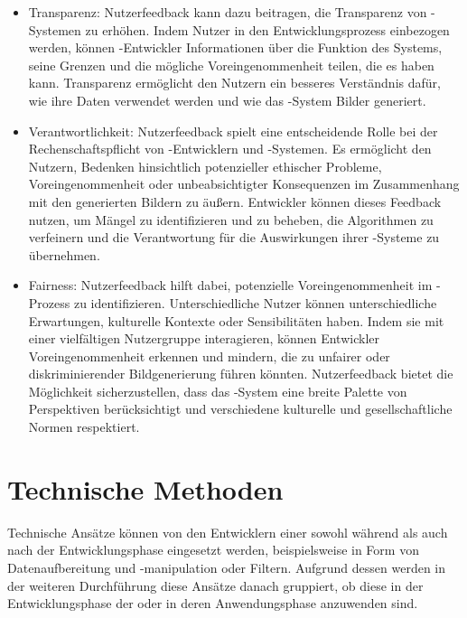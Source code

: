 \documentclass[hidelinks,12pt]{report}
\begin{document}
\begin{itemize}
	\item Transparenz: Nutzerfeedback kann dazu beitragen, die Transparenz von -Systemen zu erhöhen. Indem Nutzer in den Entwicklungsprozess einbezogen werden, können -Entwickler Informationen über die Funktion des Systems, seine Grenzen und die mögliche Voreingenommenheit teilen, die es haben kann. Transparenz ermöglicht den Nutzern ein besseres Verständnis dafür, wie ihre Daten verwendet werden und wie das -System Bilder generiert.
	\item Verantwortlichkeit: Nutzerfeedback spielt eine entscheidende Rolle bei der Rechenschaftspflicht von -Entwicklern und -Systemen. Es ermöglicht den Nutzern, Bedenken hinsichtlich potenzieller ethischer Probleme, Voreingenommenheit oder unbeabsichtigter Konsequenzen im Zusammenhang mit den generierten Bildern zu äußern. Entwickler können dieses Feedback nutzen, um Mängel zu identifizieren und zu beheben, die Algorithmen zu verfeinern und die Verantwortung für die Auswirkungen ihrer -Systeme zu übernehmen.
	\item Fairness: Nutzerfeedback hilft dabei, potenzielle Voreingenommenheit im -Prozess zu identifizieren. Unterschiedliche Nutzer können unterschiedliche Erwartungen, kulturelle Kontexte oder Sensibilitäten haben. Indem sie mit einer vielfältigen Nutzergruppe interagieren, können Entwickler Voreingenommenheit erkennen und mindern, die zu unfairer oder diskriminierender Bildgenerierung führen könnten. Nutzerfeedback bietet die Möglichkeit sicherzustellen, dass das -System eine breite Palette von Perspektiven berücksichtigt und verschiedene kulturelle und gesellschaftliche Normen respektiert.
\end{itemize}


\section{Technische Methoden}

Technische Ansätze können von den Entwicklern einer  sowohl während als auch nach der Entwicklungsphase eingesetzt werden, beispielsweise in Form von Datenaufbereitung und -manipulation oder Filtern. Aufgrund dessen werden in der weiteren Durchführung diese Ansätze danach gruppiert, ob diese in der Entwicklungsphase der  oder in deren Anwendungsphase anzuwenden sind.
\end{document}
